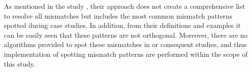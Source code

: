 As mentioned in the study \cite{dijkman2007mismatch}, their approach does not create a comprehensive list to resolve all mismatches but includes the most common mismatch patterns spotted during case studies. In addition, from their definitions and examples it can be easily seen that these patterns are not orthogonal. Moreover, there are no algorithms provided to spot these mismatches in \cite{dijkman2007mismatch} or consequent studies, and thus implementation of spotting mismatch patterns are performed within the scope of this study.